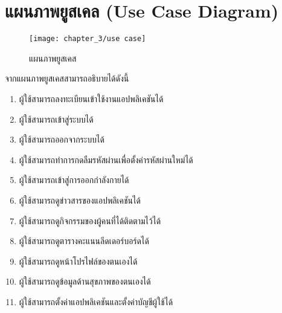 \section{แผนภาพยูสเคล (Use Case Diagram)}
\begin{figure}
    \texttt{[image: chapter\_3/use case]}
    \caption{แผนภาพยูสเคส}
\end{figure}
จากแผนภาพยูสเคสสามารถอธิบายได้ดังนี้
\begin{enumerate}
    \item ผู้ใช้สามารถลงทะเบียนเข้าใช้งานแอปพลิเคชันได้
    \item ผู้ใช้สามารถเข้าสู่ระบบได้
    \item ผู้ใช้สามารถออกจากระบบได้
    \item ผู้ใช้สามารถทำการกดลืมรหัสผ่านเพื่อตั้งค่ารหัสผ่านใหม่ได้
    \item ผู้ใช้สามารถเข้าสู่การออกกำลังกายได้
    \item ผู้ใช้สามารถดูข่าวสารของแอปพลิเคชันได้
    \item ผู้ใช้สามารถดูกิจกรรมของผู้คนที่ได้ติดตามไว้ได้
    \item ผู้ใช้สามารถดูตารางคะแนนลีดเดอร์บอร์ดได้
    \item ผู้ใช้สามารถดูหน้าโปรไฟล์ของตนเองได้
    \item ผู้ใช้สามารถดูข้อมูลด้านสุขภาพของตนเองได้
    \item ผู้ใช้สามารถตั้งค่าแอปพลิเคชันและตั้งค่าบัญชีผู้ใช้ได้
\end{enumerate}
\clearpage

